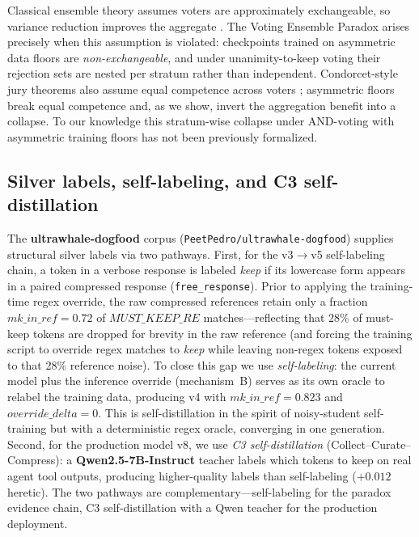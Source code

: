 Classical ensemble theory assumes voters are approximately exchangeable, so
variance reduction improves the aggregate
\citep{dietterich2000ensemble,breiman1996bagging}. The Voting Ensemble Paradox
arises precisely when this assumption is violated: checkpoints trained on
asymmetric data floors are \emph{non-exchangeable}, and under unanimity-to-keep
voting their rejection sets are nested per stratum rather than independent.
Condorcet-style jury theorems also assume equal competence across voters
\citep{condorcet1785}; asymmetric floors break equal competence and, as we
show, invert the aggregation benefit into a collapse. To our knowledge this
stratum-wise collapse under AND-voting with asymmetric training floors has not
been previously formalized.

\subsection{Silver labels, self-labeling, and C3 self-distillation}
\label{sec:rw:selflabel}

The \textbf{ultrawhale-dogfood} corpus (\texttt{PeetPedro/ultrawhale-dogfood})
supplies structural silver labels via two pathways. First, for the v3$\to$v5
self-labeling chain, a token in a verbose response is labeled \emph{keep} if
its lowercase form appears in a paired compressed response
(\texttt{free\_response}). Prior to applying the training-time regex override,
the raw compressed references retain only a fraction
$\mathit{mk\_in\_ref}=0.72$ of $\mathit{MUST\_KEEP\_RE}$ matches---reflecting
that 28\% of must-keep tokens are dropped for brevity in the raw reference
(and forcing the training script to override regex matches to \emph{keep} while
leaving non-regex tokens exposed to that 28\% reference noise). To close this gap
we use \emph{self-labeling}: the current model plus the inference override
(mechanism~B) serves as its own oracle to relabel the training data,
producing v4 with $\mathit{mk\_in\_ref}=0.823$ and
$\mathit{override\_delta}{=}0$. This is self-distillation in the spirit of
noisy-student self-training \citep{xie2020noisy} but with a deterministic
regex oracle, converging in one generation. Second, for the production model
v8, we use \emph{C3 self-distillation} (Collect--Curate--Compress): a
\textbf{Qwen2.5-7B-Instruct} \citep{qwen2024qwen25} teacher labels which
tokens to keep on real agent tool outputs, producing higher-quality labels
than self-labeling ($+0.012$ heretic). The two pathways are
complementary---self-labeling for the paradox evidence chain, C3
self-distillation with a Qwen teacher for the production deployment.
